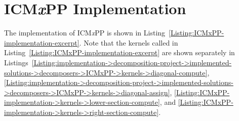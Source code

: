 \chapter{ICM\textit{x}PP Implementation}\label{Appendix:ICMxPP-implementation}
The implementation of ICM\textit{x}PP is shown in Listing~\ref{Listing:ICMxPP-implementation-excerpt}. Note that the kernels called in Listing~\ref{Listing:ICMxPP-implementation-excerpt} are shown separately in Listings~\ref{Listing:implementation->decomposition-project->implemented-solutions->decomposers->ICMxPP->kernels->diagonal-compute}, \ref{Listing:implementation->decomposition-project->implemented-solutions->decomposers->ICMxPP->kernels->diagonal-assign}, \ref{Listing:ICMxPP-implementation->kernels->lower-section-compute}, and \ref{Listing:ICMxPP-implementation->kernels->right-section-compute}.

